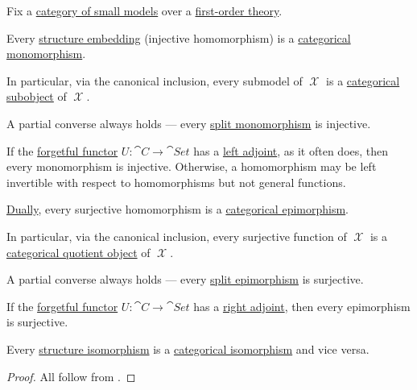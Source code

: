 \begin{proposition}\label{thm:first_order_categorical_invertibility}
  Fix a \hyperref[def:category_of_small_first_order_models]{category of small models} over a \hyperref[def:first_order_theory]{first-order theory}.

  \begin{thmenum}
     Every \hyperref[def:multi_valued_function/empty]{} \hyperref[def:first_order_embedding]{structure embedding} (injective homomorphism) is a \hyperref[def:morphism_invertibility/left_cancellative]{categorical monomorphism}.

    In particular, via the canonical inclusion, every submodel of \( \mscrX \) is a \hyperref[def:subobject_and_quotient]{categorical subobject} of \( \mscrX \).

    A partial converse always holds --- every \hyperref[def:morphism_invertibility/left_cancellative]{split monomorphism} is injective.

    If the \hyperref[def:concrete_category]{forgetful functor} \( U: \cat{C} \to \cat{Set} \) has a \hyperref[def:category_adjunction]{left adjoint}, as it often does, then every monomorphism is injective. Otherwise, a homomorphism may be left invertible with respect to homomorphisms but not general functions.

     \hyperref[thm:categorical_principle_of_duality]{Dually}, every surjective homomorphism is a \hyperref[def:morphism_invertibility/right_cancellative]{categorical epimorphism}.

    In particular, via the canonical inclusion, every surjective function of \( \mscrX \) is a \hyperref[def:subobject_and_quotient]{categorical quotient object} of \( \mscrX \).

    A partial converse always holds --- every \hyperref[def:morphism_invertibility/right_cancellative]{split epimorphism} is surjective.

    If the \hyperref[def:concrete_category]{forgetful functor} \( U: \cat{C} \to \cat{Set} \) has a \hyperref[def:category_adjunction]{right adjoint}, then every epimorphism is surjective.

     Every \hyperref[def:first_order_embedding]{structure isomorphism} is a \hyperref[def:morphism_invertibility/isomorphism]{categorical isomorphism} and vice versa.
  \end{thmenum}
\end{proposition}
\begin{proof}
  All follow from .
\end{proof}

